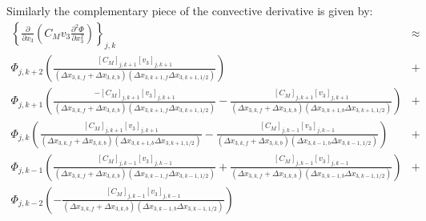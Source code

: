\documentclass[11pt,letterpaper]{article}
\begin{document}
Similarly the complementary piece of the convective derivative is given by:
\begin{eqnarray}
\left\{ \frac{\partial}{\partial x_3} \left( C_M v_3 \frac{\partial^2 \Phi }{\partial x_3^2} \right) \right\}_{j,k} &\approx& \nonumber \\
\Phi_{j,k+2} \left( \frac{[C_M]_{j,k+1} [v_{3}]_{j,k+1}}{\left( \Delta x_{3,k,f} + \Delta x_{3,k,b} \right) \left( \Delta x_{3,k+1,f} \Delta x_{3,k+1,1/2} \right)} \right) &+& \nonumber \\
\Phi_{j,k+1} \left( \frac{-[C_M]_{j,k+1} [v_{3}]_{j,k+1}}{\left( \Delta x_{3,k,f} + \Delta x_{3,k,b} \right) \left( \Delta x_{3,k+1,f} \Delta x_{3,k+1,1/2} \right)} - \frac{[C_M]_{j,k+1} [v_{3}]_{j,k+1}}{\left( \Delta x_{3,k,f} + \Delta x_{3,k,b} \right) \left( \Delta x_{3,k+1,b} \Delta x_{3,k+1,1/2} \right)} \right) &+& \nonumber \\
\Phi_{j,k} \left(  \frac{[C_M]_{j,k+1} [v_{3}]_{j,k+1}}{\left( \Delta x_{3,k,f} + \Delta x_{3,k,b} \right) \left( \Delta x_{3,k+1,b} \Delta x_{3,k+1,1/2} \right)}  - \frac{[C_M]_{j,k-1} [v_{3}]_{j,k-1}}{\left( \Delta x_{3,k,f} + \Delta x_{3,k,b} \right) \left( \Delta x_{3,k-1,b} \Delta x_{3,k-1,1/2} \right)}  \right) &+& \nonumber \\
\Phi_{j,k-1} \left( \frac{[C_M]_{j,k-1} [v_{3}]_{j,k-1}}{\left( \Delta x_{3,k,f} + \Delta x_{3,k,b} \right) \left( \Delta x_{3,k-1,f} \Delta x_{3,k-1,1/2} \right)} + \frac{[C_M]_{j,k-1} [v_{3}]_{j,k-1}}{\left( \Delta x_{3,k,f} + \Delta x_{3,k,b} \right) \left( \Delta x_{3,k-1,b} \Delta x_{3,k-1,1/2} \right)} \right) &+& \nonumber \\
\Phi_{j,k-2} \left( - \frac{[C_M]_{j,k-1} [v_{3}]_{j,k-1}}{\left( \Delta x_{3,k,f} + \Delta x_{3,k,b} \right) \left( \Delta x_{3,k-1,b} \Delta x_{3,k-1,1/2} \right)} \right)
\end{eqnarray}
\end{document}
